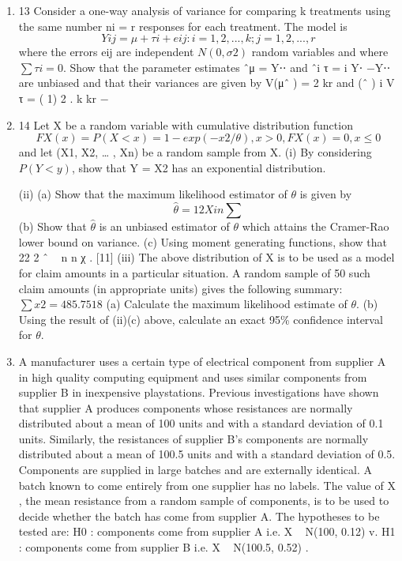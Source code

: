 \documentclass[a4paper,12pt]{article}
\begin{document}
\begin{enumerate}


\item 13 Consider a one-way analysis of variance for comparing k treatments using the
same number ni = r responses for each treatment. The model is
\[Yij = μ + τi + eij : i = 1, 2, ..., k; j = 1,2, ..., r\]
where the errors eij are independent $N(0, \sigma 2)$ random variables and where $\sum τi = 0$.
Show that the parameter estimates ˆμ = Y⋅⋅ and ˆi τ = i Y⋅ −Y⋅⋅ are unbiased and
that their variances are given by
V(μˆ ) =
2
kr
\sum  and (ˆ ) i V τ =
( 1) 2
.
k
kr
− \sum  
\item 14 Let X be a random variable with cumulative distribution function
\[FX(x) = P(X < x) = 1 − exp(−x2/\theta) , x > 0 , FX(x) = 0 , x ≤ 0\]
and let (X1, X2, … , Xn) be a random sample from X.
(i) By considering $P(Y < y)$, show that Y = X2 has an exponential distribution.

(ii) (a) Show that the maximum likelihood estimator of $\theta$ is given by
\[\hat{\theta}
= 1 2
Xi
n
\sum \]
(b) Show that $\hat{\theta}$ is an unbiased estimator of $\theta$ which attains the
Cramer-Rao lower bound on variance.
(c) Using moment generating functions, show that 22
2 ˆ ~ n
n \theta χ
\theta
. [11]
(iii) The above distribution of X is to be used as a model for claim amounts in
a particular situation. A random sample of 50 such claim amounts (in
appropriate units) gives the following summary:
$\sum x2 = 485.7518$
(a) Calculate the maximum likelihood estimate of $\theta$.
(b) Using the result of (ii)(c) above, calculate an exact 95\% confidence interval for $\theta$. 

\item  A manufacturer uses a certain type of electrical component from supplier A in high quality computing equipment and uses similar components from supplier B in inexpensive playstations. Previous investigations have shown that supplier A
produces components whose resistances are normally distributed about a mean of 100 units and with a standard deviation of 0.1 units. Similarly, the resistances of supplier B’s components are normally distributed about a mean of 100.5 units
and with a standard deviation of 0.5. Components are supplied in large batches and are externally identical.
A batch known to come entirely from one supplier has no labels. The value of X , the mean resistance from a random sample of components, is to be used to decide whether the batch has come from supplier A.
The hypotheses to be tested are:
H0 : components come from supplier A i.e. X ~ N(100, 0.12)
v. H1 : components come from supplier B i.e. X ~ N(100.5, 0.52) .


\end{enumerate}
\end{document}
